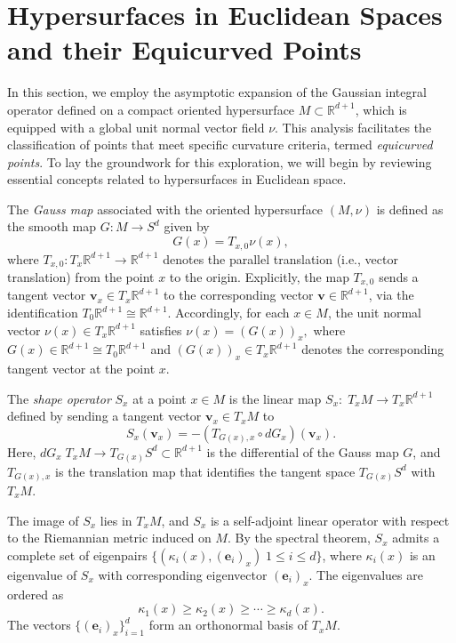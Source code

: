 \documentclass{amsart}
\theoremstyle{Theorem}
\theoremstyle{remark}
\numberwithin{equation}{section} \numberwithin{figure}{section}
\renewcommand*{\to}{\rightarrow}
\begin{document}
\section{Hypersurfaces in Euclidean Spaces and their Equicurved Points}
In this section, we employ the asymptotic expansion of the Gaussian integral operator defined on a compact oriented hypersurface \( M \subset \mathbb{R}^{d+1} \), which is equipped with a global unit normal vector field \( \nu \). This analysis facilitates the classification of points that meet specific curvature criteria, termed \emph{equicurved points}. To lay the groundwork for this exploration, we will begin by reviewing essential concepts related to hypersurfaces in Euclidean space.

The \emph{Gauss map} associated with the oriented hypersurface \( (M, \nu) \) is defined as the smooth map
\(
G : M \to S^d 
\)
given by
\[
G(x) = T_{x,0} \nu(x),
\]
where \( T_{x,0} : T_x \mathbb{R}^{d+1} \to \mathbb{R}^{d+1} \) denotes the parallel translation (i.e., vector translation) from the point \( x \) to the origin. Explicitly, the map \( T_{x, 0} \) sends a tangent vector \( \mathbf{v}_x \in T_x \mathbb{R}^{d+1} \) to the corresponding vector \( \mathbf{v} \in \mathbb{R}^{d+1} \), via the identification \( T_0 \mathbb{R}^{d+1} \cong \mathbb{R}^{d+1} \).  
Accordingly, for each \( x \in M \), the unit normal vector \( \nu(x) \in T_x \mathbb{R}^{d+1} \) satisfies
\(
\nu(x) = (G(x))_x,
\)
where \( G(x) \in \mathbb{R}^{d+1} \cong T_0 \mathbb{R}^{d+1} \) and \( (G(x))_x \in T_x \mathbb{R}^{d+1} \) denotes the corresponding tangent vector at the point \( x \). 

The \emph{shape operator} \( S_x \) at a point \( x \in M \) is the linear map
\(
S_x :\; T_x M \to T_x \mathbb{R}^{d+1}
\)
defined by sending a tangent vector \( \mathbf{v}_x \in T_x M \) to
\[
S_x(\mathbf{v}_x) = -(T_{G(x), x} \circ dG_x)(\mathbf{v}_x).
\]
Here, \( dG_x \; T_x M \to T_{G(x)} S^d \subset \mathbb{R}^{d+1} \) is the differential of the Gauss map \( G \), and \( T_{G(x), x} \) is the translation map that identifies the tangent space \( T_{G(x)} S^d \) with \( T_x M \).

The image of \( S_x \) lies in \( T_x M \), and \( S_x \) is a self-adjoint linear operator with respect to the Riemannian metric induced on \( M \). By the spectral theorem, \( S_x \) admits a complete set of eigenpairs \( \{ (\kappa_i(x), (\mathbf{e}_i)_x) \; 1 \leq i \leq d \} \), where \( \kappa_i(x) \) is an eigenvalue of \( S_x \) with corresponding eigenvector \( (\mathbf{e}_i)_x \). The eigenvalues are ordered as
\[
\kappa_1(x) \geq \kappa_2(x) \geq \cdots \geq \kappa_d(x).
\]
The vectors \( \{ (\mathbf{e}_i)_x \}_{i=1}^d \) form an orthonormal basis of \( T_x M \).
\end{document}
